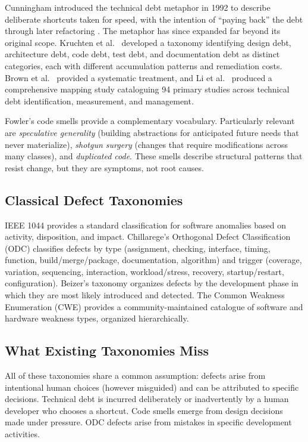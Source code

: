 \documentclass[11pt, a4paper, copyright]{googledeepmind}
\begin{document}
Cunningham introduced the technical debt metaphor in 1992 to describe deliberate shortcuts taken for speed, with the intention of ``paying back'' the debt through later refactoring \citep{cunningham1992}. The metaphor has since expanded far beyond its original scope. Kruchten et al.\ \citep{kruchten2012} developed a taxonomy identifying design debt, architecture debt, code debt, test debt, and documentation debt as distinct categories, each with different accumulation patterns and remediation costs. Brown et al.\ \citep{brown2010} provided a systematic treatment, and Li et al.\ \citep{li2015} produced a comprehensive mapping study cataloguing 94 primary studies across technical debt identification, measurement, and management.

Fowler's code smells \citep{fowler1999} provide a complementary vocabulary. Particularly relevant are \emph{speculative generality} (building abstractions for anticipated future needs that never materialize), \emph{shotgun surgery} (changes that require modifications across many classes), and \emph{duplicated code}. These smells describe structural patterns that resist change, but they are symptoms, not root causes.

\subsection{Classical Defect Taxonomies}

IEEE 1044 \citep{ieee1044} provides a standard classification for software anomalies based on activity, disposition, and impact. Chillarege's Orthogonal Defect Classification (ODC) \citep{chillarege1992} classifies defects by type (assignment, checking, interface, timing, function, build/merge/package, documentation, algorithm) and trigger (coverage, variation, sequencing, interaction, workload/stress, recovery, startup/restart, configuration). Beizer's taxonomy \citep{beizer1990} organizes defects by the development phase in which they are most likely introduced and detected. The Common Weakness Enumeration (CWE) \citep{cwe2024} provides a community-maintained catalogue of software and hardware weakness types, organized hierarchically.

\subsection{What Existing Taxonomies Miss}

All of these taxonomies share a common assumption: defects arise from intentional human choices (however misguided) and can be attributed to specific decisions. Technical debt is incurred deliberately or inadvertently by a human developer who chooses a shortcut. Code smells emerge from design decisions made under pressure. ODC defects arise from mistakes in specific development activities.
\end{document}
